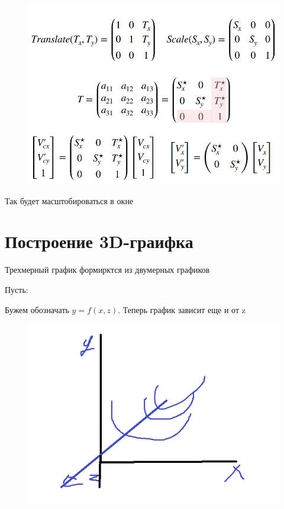 \documentclass{article}
\begin{document}
\begin{figure} [H]
    \includegraphics[width=0.70\linewidth]{Снимок экрана 2025-03-17 132004.png}
\end{figure}

Так будет масштобироваться в окне

\section{Построение 3D-граифка}

Трехмерный график формирктся из двумерных графиков


Пусть:


Бужем обозначать $y = f(x,z)$. Теперь график зависит еще и от z

\begin{figure} [H]
    \includegraphics[width=1\linewidth]{tri.png}
\end{figure}
\end{document}
